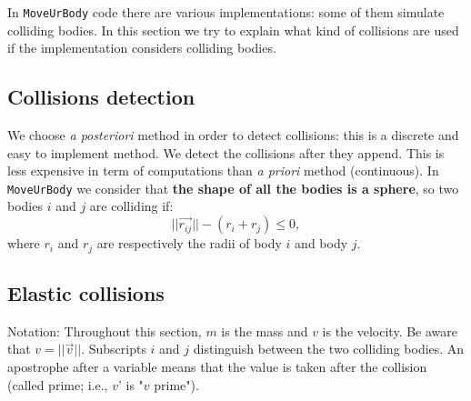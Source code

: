 In \texttt{MoveUrBody} code there are various implementations: some of them simulate colliding bodies.
In this section we try to explain what kind of collisions are used if the implementation considers colliding bodies.

\subsection{Collisions detection}
We choose \textit{a posteriori} method in order to detect collisions: this is a discrete and easy to implement method.
We detect the collisions after they append. 
This is less expensive in term of computations than \textit{a priori} method (continuous).
In \texttt{MoveUrBody} we consider that \textbf{the shape of all the bodies is a sphere}, so two bodies $i$ and $j$ are colliding if:
\begin{equation}	
\label{eq:collsDetection}
	||\vec{r_{ij}}|| - (r_i + r_j) \leq 0,
\end{equation}
where $r_i$ and $r_j$ are respectively the radii of body $i$ and body $j$.

\subsection{Elastic collisions}
Notation: Throughout this section, $m$ is the mass and $v$ is the velocity.
Be aware that $v = ||\vec{v}||$.
Subscripts $i$ and $j$ distinguish between the two colliding bodies. 
An apostrophe after a variable means that the value is taken after the collision (called prime; i.e., $v$' is "$v$ prime").\\


